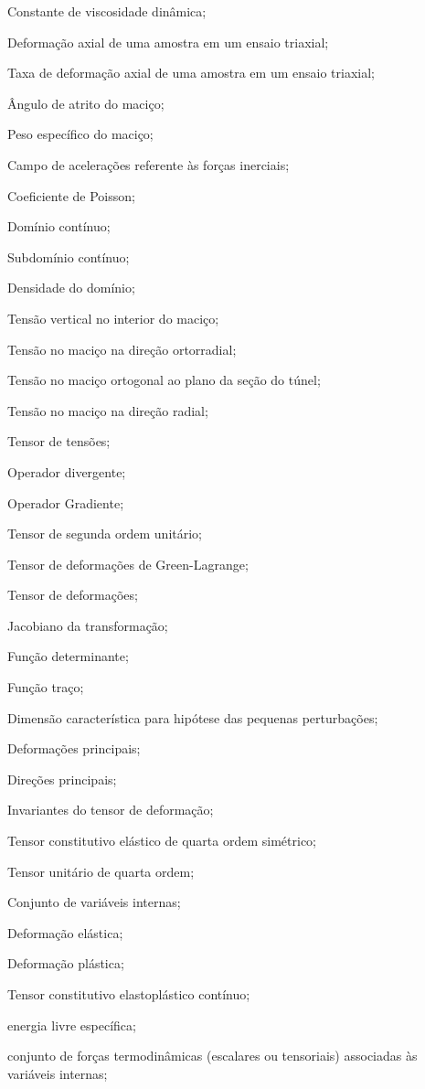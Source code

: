 \item[$ \eta $] 		Constante de viscosidade dinâmica;
\item[$ \varepsilon_a $] Deformação axial de uma amostra em um ensaio triaxial;
\item[$ \dot{\varepsilon_a} $] Taxa de deformação axial de uma amostra em um ensaio triaxial;
\item[$ \phi $] 		Ângulo de atrito do maciço;
\item[$\gamma_m$] 		Peso específico do maciço;
\item[$ \gammal $] 		Campo de acelerações referente às forças inerciais;
\item[$ \nu $] 			Coeficiente de Poisson;
\item[$ \Omega $] 		Domínio contínuo;
\item[$ \Omega' $] 		Subdomínio contínuo;
\item[$ \rho $] 		Densidade do domínio;
\item[$ \sigma_{v} $] 	Tensão vertical no interior do maciço;
\item[$ \sigma_{\theta \theta} $] Tensão no maciço na direção ortorradial;
\item[$ \sigma_{zz} $] 	Tensão no maciço ortogonal ao plano da seção do túnel;
\item[$ \sigma_{rr} $] 	Tensão no maciço na direção radial;
\item[$ \sigmall $] 	Tensor de tensões;
\item[$ \divl $] 	Operador divergente;
\item[$ \nabla $] 	Operador Gradiente;
\item[$ \Umll $] 	Tensor de segunda ordem unitário;
\item[$ \greenll $] 	Tensor de deformações de Green-Lagrange;
\item[$ \varepsilonll $] 	Tensor de deformações;
\item[$ J $] 	Jacobiano da transformação;
\item[det($\cdot$)] 	Função determinante;
\item[tr($\cdot$)] 	Função traço;
\item[$l_0$] 	Dimensão característica para hipótese das pequenas perturbações;
\item[$\varepsilon_1,\varepsilon_2,\varepsilon_3$] 	Deformações principais;
\item[$\eta_1,\eta_2,\eta_3$] 	Direções principais;
\item[$I_1,I_2,I_3$] 	Invariantes do tensor de deformação;
\item[$\Dllll$] Tensor constitutivo elástico de quarta ordem simétrico;
\item[$\Umllll$] Tensor unitário de quarta ordem;
\item[$\alphal$] Conjunto de variáveis internas;
\item[$\varepsilonll^e$] Deformação elástica;
\item[$\varepsilonll^p$] Deformação plástica;
\item[$\Dllll^{ep}$] Tensor constitutivo elastoplástico contínuo;
\item[$\psi$] energia livre específica;
\item[$\ql$] conjunto de forças termodinâmicas (escalares ou tensoriais) associadas às variáveis internas;